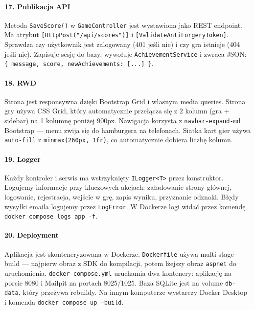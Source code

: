 \documentclass[12pt,a4paper]{article}
\newcommand{\code}[1]{\texttt{\small#1}}
\begin{document}
\paragraph{17. Publikacja API}
Metoda \code{SaveScore()} w \code{GameController} jest wystawiona jako REST endpoint. Ma atrybut
\code{[HttpPost("/api/scores")]} i \code{[ValidateAntiForgeryToken]}. Sprawdza czy użytkownik jest zalogowany
(401 jeśli nie) i czy gra istnieje (404 jeśli nie). Zapisuje sesję do bazy, wywołuje \code{AchievementService}
i zwraca JSON: \code{\{ message, score, newAchievements: [...] \}}.

\paragraph{18. RWD}
Strona jest responsywna dzięki Bootstrap Grid i własnym media queries. Strona gry używa CSS Grid, który
automatycznie przełącza się z 2 kolumn (gra + sidebar) na 1 kolumnę poniżej 900px. Nawigacja korzysta
z \code{navbar-expand-md} Bootstrap --- menu zwija się do hamburgera na telefonach. Siatka kart gier używa
\code{auto-fill} z \code{minmax(260px, 1fr)}, co automatycznie dobiera liczbę kolumn.

\paragraph{19. Logger}
Każdy kontroler i serwis ma wstrzyknięty \code{ILogger<T>} przez konstruktor. Logujemy informacje przy
kluczowych akcjach: załadowanie strony głównej, logowanie, rejestracja, wejście w grę, zapis wyniku,
przyznanie odznaki. Błędy wysyłki emaila logujemy przez \code{LogError}. W Dockerze logi widać przez
komendę \code{docker compose logs app -f}.

\paragraph{20. Deployment}
Aplikacja jest skonteneryzowana w Dockerze. \code{Dockerfile} używa multi-stage build --- najpierw obraz
z SDK do kompilacji, potem lżejszy obraz \code{aspnet} do uruchomienia. \code{docker-compose.yml} uruchamia
dwa kontenery: aplikację na porcie 8080 i Mailpit na portach 8025/1025. Baza SQLite jest na volume
\code{db-data}, który przeżywa rebuildy. Na innym komputerze wystarczy Docker Desktop i komenda
\code{docker compose up --build}.
\end{document}
